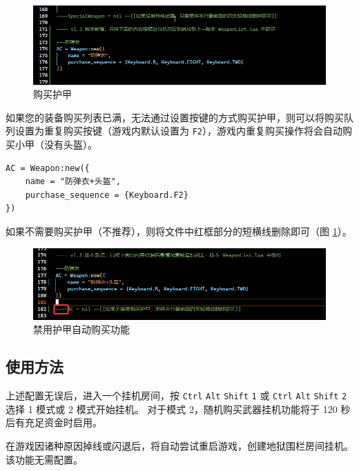 \begin{figure}
    \Centering
    \includegraphics[width=\textwidth]{docs/assets/buy_ac.png}
    \caption{购买护甲}
\end{figure}

如果您的装备购买列表已满，无法通过设置按键的方式购买护甲，则可以将购买队列设置为重复购买按键（游戏内默认设置为 \lstinline{F2}），游戏内重复购买操作将会自动购买小甲（没有头盔）。

\begin{verbatim}
AC = Weapon:new({
    name = "防弹衣+头盔",
    purchase_sequence = {Keyboard.F2}
})
\end{verbatim}

如果不需要购买护甲（不推荐），则将文件中红框部分的短横线删除即可（图 \ref{ch2fig-delete-ac}）。

\begin{figure}
    \Centering
    \includegraphics[width=\textwidth]{docs/assets/delete_AC.png}
    \caption{禁用护甲自动购买功能}
    \label{ch2fig-delete-ac}
\end{figure}

\subsection{使用方法}

上述配置无误后，进入一个挂机房间，按 \lstinline{Ctrl} \lstinline{Alt} \lstinline{Shift} \lstinline{1} 或 \lstinline{Ctrl} \lstinline{Alt} \lstinline{Shift} \lstinline{2} 选择 1 模式或 2 模式开始挂机。
对于模式 2，随机购买武器挂机功能将于 120 秒后有充足资金时启用。

在游戏因诸种原因掉线或闪退后，将自动尝试重启游戏，创建地狱围栏房间挂机。该功能无需配置。